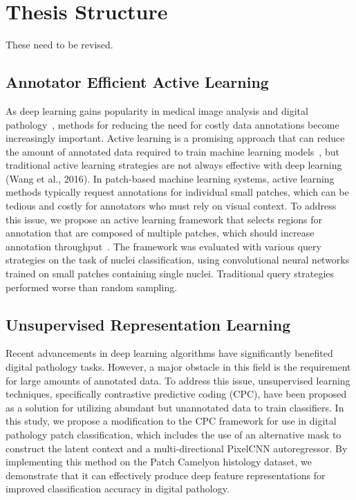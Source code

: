 \section{Thesis Structure}
\label{sec:thesis_structure}
These need to be revised.

\subsection*{Annotator Efficient Active Learning}
As deep learning gains popularity in medical image analysis and digital pathology~\citep{tizhoosh2018artificial}, methods for reducing the need for costly data annotations become increasingly important. Active learning is a promising approach that can reduce the amount of annotated data required to train machine learning models~\citep{settles2012active}, but traditional active learning strategies are not always effective with deep learning (Wang et al., 2016). In patch-based machine learning systems, active learning methods typically request annotations for individual small patches, which can be tedious and costly for annotators who must rely on visual context. To address this issue, we propose an active learning framework that selects regions for annotation that are composed of multiple patches, which should increase annotation throughput~\citep{carse2019active}. The framework was evaluated with various query strategies on the task of nuclei classification, using convolutional neural networks trained on small patches containing single nuclei. Traditional query strategies performed worse than random sampling.

\subsection*{Unsupervised Representation Learning}
Recent advancements in deep learning algorithms have significantly benefited digital pathology tasks. However, a major obstacle in this field is the requirement for large amounts of annotated data. To address this issue, unsupervised learning techniques, specifically contrastive predictive coding (CPC), have been proposed as a solution for utilizing abundant but unannotated data to train classifiers. In this study, we propose a modification to the CPC framework for use in digital pathology patch classification, which includes the use of an alternative mask to construct the latent context and a multi-directional PixelCNN autoregressor. By implementing this method on the Patch Camelyon histology dataset, we demonstrate that it can effectively produce deep feature representations for improved classification accuracy in digital pathology.

